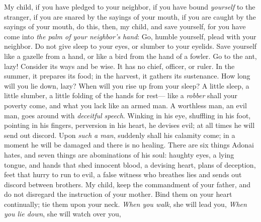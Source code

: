 \begin{biblechapter} %
 My child, if you have pledged to your neighbor, 
if you have bound \textit{yourself} to the stranger,
\verse if you are snared by the sayings of your mouth, 
if you are caught by the sayings of your mouth,
\verse do this, then, my child, and save yourself, 
for you have come into \textit{the palm of your neighbor’s hand}: 
Go, humble yourself, plead with your neighbor.
\verse Do not give sleep to your eyes, 
or slumber to your eyelids.
\verse Save yourself like a gazelle from a hand, 
or like a bird from the hand of a fowler.
 Go to the ant, lazy! 
Consider its ways and be wise.
\verse It has no chief, 
officer, or ruler.
\verse In the summer, it prepares its food; 
in the harvest, it gathers its sustenance.
\verse How long will you lie down, lazy? 
When will you rise up from your sleep?
\verse A little sleep, a little slumber, 
a little folding of the hands for rest—
\verse like a \textit{robber} shall your poverty come, 
and what you lack like an armed man.
 A worthless man, an evil man, 
goes around with \textit{deceitful speech}.
\verse Winking in his eye, shuffling in his foot, 
pointing in his fingers,
\verse perversion in his heart, he devises evil; 
at all times he will send out discord.
\verse Upon \textit{such a man}, suddenly shall his calamity come; 
in a moment he will be damaged and there is no healing.
 There are six things Adonai hates, 
and seven things are abominations of his soul:
\verse haughty eyes, a lying tongue, 
and hands that shed innocent blood,
\verse a devising heart, plans of deception, 
feet that hurry to run to evil,
\verse a false witness who breathes lies 
and sends out discord between brothers.
 My child, keep the commandment of your father, 
and do not disregard the instruction of your mother.
\verse Bind them on your heart continually; 
tie them upon your neck.
\verse \textit{When you walk}, she will lead you, 
\textit{When you lie down}, she will watch over you, 

\end{biblechapter}
